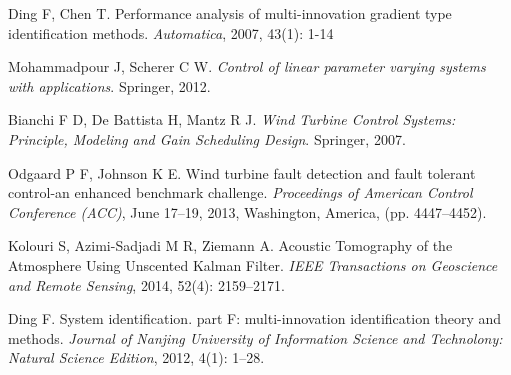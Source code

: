\documentclass{article}
\begin{document}
\begin{thebibliography}{99}
Ding F, Chen T. Performance analysis of multi-innovation gradient type identification methods. \emph{Automatica}, 2007, 43(1): 1-14

Mohammadpour J, Scherer C W. \emph{Control of linear parameter varying systems with applications}. Springer, 2012.

Bianchi F D, De Battista H, Mantz R J. \emph{Wind Turbine Control Systems: Principle, Modeling and Gain Scheduling Design}. Springer, 2007.



Odgaard P F, Johnson K E. Wind turbine fault detection and fault tolerant control-an enhanced benchmark challenge. \emph{Proceedings of American Control Conference (ACC)}, June 17--19, 2013, Washington, America, (pp. 4447--4452).

Kolouri S, Azimi-Sadjadi  M R, Ziemann A. Acoustic Tomography of the Atmosphere Using Unscented Kalman Filter. \emph{IEEE Transactions on Geoscience and Remote Sensing}, 2014, 52(4): 2159--2171.

Ding F. System identification. part F:  multi-innovation identification theory and methods. \emph{Journal of Nanjing University of Information Science and Technolony: Natural Science Edition}, 2012, 4(1): 1--28.





\end{thebibliography}
\end{document}
